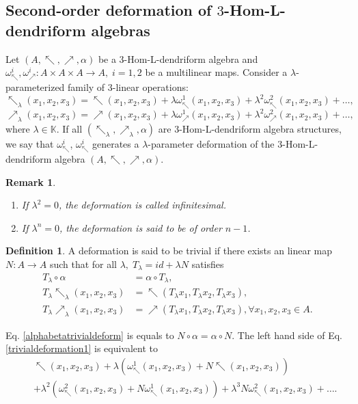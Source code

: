 \documentclass[a4paper,11pt]{article}
\def\nw{\nwarrow}
\def\ne{\nearrow}
\newtheorem{rem}[thm]{Remark}
\theoremstyle{definition}
\newtheorem{defi}{Definition}[section]
\begin{document}
\subsection{Second-order deformation of $3$-Hom-L-dendriform algebras}
Let $(A,\nw,\ne,\alpha)$ be a $3$-Hom-L-dendriform algebra and $\omega_\nw^i,\omega_\ne^i:A\times A \times A\longrightarrow A,\;i=1,2$ be  a multilinear maps. Consider a $\lambda$-parameterized
family of $3$-linear operations:
\begin{equation}\label{omegaparam}
\nw_\lambda(x_1,x_2,x_3)=\nw(x_1,x_2,x_3)+\lambda\omega_\nw^1(x_1,x_2,x_3)+\lambda^2\omega_\nw^2(x_1,x_2,x_3)+\dots,
\end{equation}\begin{equation}\label{omegaparam1}
\ne_\lambda(x_1,x_2,x_3)=\ne(x_1,x_2,x_3)+\lambda\omega_\ne^1(x_1,x_2,x_3)+\lambda^2\omega_\ne^2(x_1,x_2,x_3)+\dots,
\end{equation}
where $\lambda\in \mathbb{K}$. If all $(\nw_\lambda,\ne_\lambda,\alpha)$ are $3$-Hom-L-dendriform algebra structures, we say
that $\omega_\nw^i$, $\omega_\nw^i$ generates  a  $\lambda$-parameter deformation of the $3$-Hom-L-dendriform algebra $(A,\nw,\ne,\alpha)$.
\begin{rem}
\begin{enumerate}
\item If $\lambda^2=0$, the deformation is called infinitesimal.
\item If $\lambda^n=0$,  the deformation is said to be of order $n-1$.
\end{enumerate}
\end{rem}
\begin{defi}
  A deformation is said to be trivial if there exists an linear map $N:A\longrightarrow A$ such that for all $\lambda,\;T_\lambda=id+\lambda N$ satisfies
\begin{align}
T_\lambda\circ\alpha&=\alpha\circ T_\lambda,\label{alphabetatrivialdeform}\\
T_\lambda\nw_\lambda(x_1,x_2,x_3)&=\nw(T_\lambda x_1,T_\lambda x_2,T_\lambda x_3),\label{trivialdeformation1}\\
T_\lambda\ne_\lambda(x_1,x_2,x_3)&=\ne(T_\lambda x_1,T_\lambda x_2,T_\lambda x_3),\forall x_1,x_2,x_3\in A. \label{trivialdeformation2}
\end{align}
\end{defi}
Eq. \eqref{alphabetatrivialdeform} is equals to $N\circ\alpha=\alpha\circ N.$
The left hand side of Eq. \eqref{trivialdeformation1} is equivalent to
\begin{eqnarray*}
&&\nw(x_1,x_2,x_3)+\lambda(\omega_\nw^1(x_1,x_2,x_3)+N\nw(x_1,x_2,x_3))\\&&+
\lambda^2(\omega_\nw^2(x_1,x_2,x_3)+N\omega_\nw^1(x_1,x_2,x_3))+\lambda^3N\omega_\nw^2(x_1,x_2,x_3)+\dots.
\end{eqnarray*}
\end{document}
